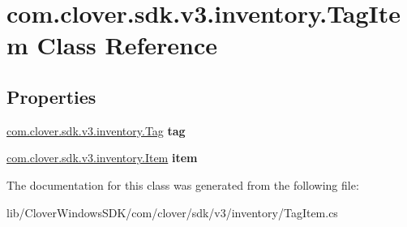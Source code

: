 \hypertarget{classcom_1_1clover_1_1sdk_1_1v3_1_1inventory_1_1_tag_item}{}\section{com.\+clover.\+sdk.\+v3.\+inventory.\+Tag\+Item Class Reference}
\label{classcom_1_1clover_1_1sdk_1_1v3_1_1inventory_1_1_tag_item}
\subsection*{Properties}
\begin{DoxyCompactItemize}
\item 
\mbox{\label{classcom_1_1clover_1_1sdk_1_1v3_1_1inventory_1_1_tag_item_a8f39ec699294a8fcf7f798331c101d2c}} 
\hyperlink{classcom_1_1clover_1_1sdk_1_1v3_1_1inventory_1_1_tag}{com.\+clover.\+sdk.\+v3.\+inventory.\+Tag} {\bfseries tag}
\item 
\mbox{\label{classcom_1_1clover_1_1sdk_1_1v3_1_1inventory_1_1_tag_item_a8949d2793987e0696940b9b7fce35928}} 
\hyperlink{classcom_1_1clover_1_1sdk_1_1v3_1_1inventory_1_1_item}{com.\+clover.\+sdk.\+v3.\+inventory.\+Item} {\bfseries item}
\end{DoxyCompactItemize}


The documentation for this class was generated from the following file\+:\begin{DoxyCompactItemize}
\item 
lib/\+Clover\+Windows\+S\+D\+K/com/clover/sdk/v3/inventory/Tag\+Item.\+cs\end{DoxyCompactItemize}
